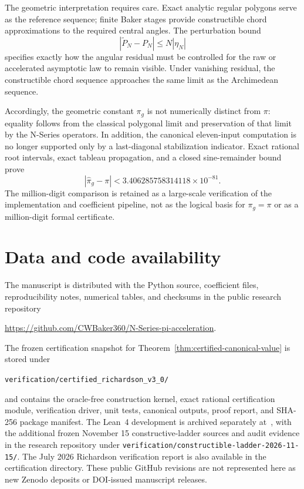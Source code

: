 \documentclass[12pt]{article}
\theoremstyle{definition}
\theoremstyle{remark}
\newcommand{\abs}[1]{\left|#1\right|}
\begin{document}
The geometric interpretation requires care.  Exact analytic regular polygons
serve as the reference sequence; finite Baker stages provide constructible
chord approximations to the required central angles.  The perturbation bound
\[
  \abs{\widetilde P_N-P_N}\le N\abs{\eta_N}
\]
specifies exactly how the angular residual must be controlled for the raw or
accelerated asymptotic law to remain visible.  Under vanishing residual, the
constructible chord sequence approaches the same limit as the Archimedean
sequence.

Accordingly, the geometric constant $\pi_g$ is not numerically distinct from
$\pi$: equality follows from the classical polygonal limit and preservation of
that limit by the N-Series operators.  In addition, the canonical eleven-input
computation is no longer supported only by a last-diagonal stabilization
indicator.  Exact rational root intervals, exact tableau propagation, and a
closed sine-remainder bound prove
\[
  \abs{\widehat\pi_g-\pi}
  <3.406285758314118\times10^{-81}.
\]
The million-digit comparison is retained as a large-scale verification of the
implementation and coefficient pipeline, not as the logical basis for
$\pi_g=\pi$ or as a million-digit formal certificate.

\section*{Data and code availability}

The manuscript is distributed with the Python source, coefficient files,
reproducibility notes, numerical tables, and checksums in the public research
repository
\begin{center}
\url{https://github.com/CWBaker360/N-Series-pi-acceleration}.
\end{center}
The frozen certification snapshot for Theorem~\ref{thm:certified-canonical-value}
is stored under
\begin{center}
\texttt{verification/certified\_richardson\_v3\_0/}
\end{center}
and contains the oracle-free construction kernel, exact rational certification
module, verification driver, unit tests, canonical outputs, proof report, and
SHA-256 package manifest.  The Lean~4 development is archived separately
at~\cite{nseries-lean}, with the additional frozen November 15 constructive-ladder
sources and audit evidence in the research repository under
\texttt{verification/constructible-ladder-2026-11-15/}. The July 2026
Richardson verification report is also available in the certification directory.
These public GitHub revisions are not represented here as new Zenodo deposits
or DOI-issued manuscript releases.
\end{document}
